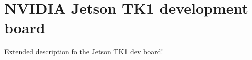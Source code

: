 \section{NVIDIA Jetson TK1 development board}
\label{sec:jetson_tk1}

Extended description fo the Jetson TK1 dev board!
